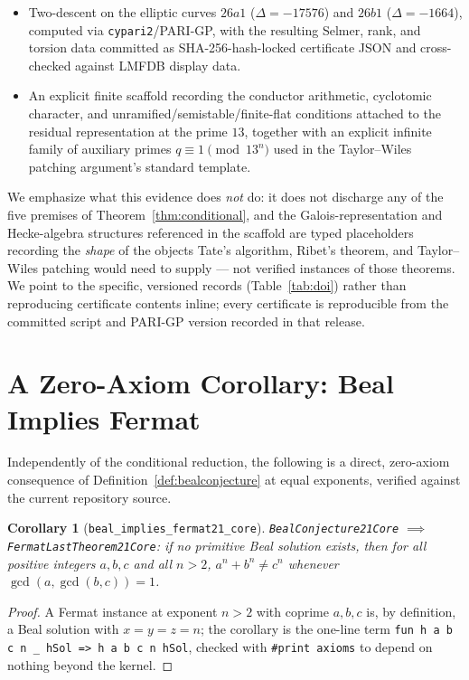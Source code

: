 \documentclass{amsart}
\newtheorem{corollary}[theorem]{Corollary}
\begin{document}
\begin{itemize}
  \item Two-descent on the elliptic curves $26a1$
  ($\Delta=-17576$) and $26b1$ ($\Delta=-1664$), computed via
  \texttt{cypari2}/PARI-GP, with the resulting Selmer, rank, and torsion
  data committed as SHA-256-hash-locked certificate JSON and cross-checked
  against LMFDB display data.
  \item An explicit finite scaffold recording the conductor arithmetic,
  cyclotomic character, and unramified/semistable/finite-flat conditions
  attached to the residual representation at the prime $13$, together
  with an explicit infinite family of auxiliary primes
  $q\equiv 1\pmod{13^n}$ used in the Taylor--Wiles patching argument's
  standard template.
\end{itemize}

We emphasize what this evidence does \emph{not} do: it does not discharge
any of the five premises of Theorem~\ref{thm:conditional}, and the
Galois-representation and Hecke-algebra structures referenced in the
scaffold are typed placeholders recording the \emph{shape} of the objects
Tate's algorithm, Ribet's theorem, and Taylor--Wiles patching would need
to supply — not verified instances of those theorems. We point to the
specific, versioned records (Table~\ref{tab:doi}) rather than reproducing
certificate contents inline; every certificate is reproducible from the
committed script and PARI-GP version recorded in that release.

\section{A Zero-Axiom Corollary: Beal Implies Fermat}

Independently of the conditional reduction, the following is a direct,
zero-axiom consequence of Definition~\ref{def:bealconjecture} at equal
exponents, verified against the current repository source.

\begin{corollary}[\texttt{beal\_implies\_fermat21\_core}]
\texttt{BealConjecture21Core} $\implies$ \texttt{FermatLastTheorem21Core}:
if no primitive Beal solution exists, then for all positive integers
$a,b,c$ and all $n>2$, $a^n+b^n\ne c^n$ whenever $\gcd(a,\gcd(b,c))=1$.
\end{corollary}

\begin{proof}
A Fermat instance at exponent $n>2$ with coprime $a,b,c$ is, by
definition, a Beal solution with $x=y=z=n$; the corollary is the
one-line term \texttt{fun h a b c n \_ hSol => h a b c n hSol}, checked
with \texttt{\#print axioms} to depend on nothing beyond the kernel.
\end{proof}
\end{document}
